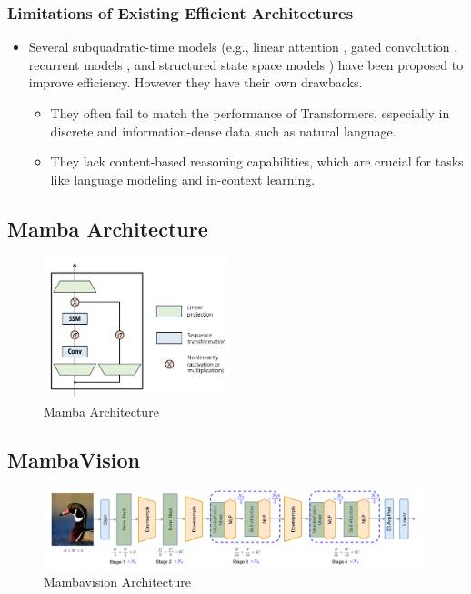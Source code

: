 \documentclass[12pt, conference, compsoc, onecolumn]{IEEEtran}
\begin{document}
	\subsubsection*{Limitations of Existing Efficient Architectures}
	\begin{itemize}
		\item Several subquadratic-time models (e.g., linear attention \cite{katharopoulos2020transformersrnnsfastautoregressive}, gated convolution \cite{rao2022hornetefficienthighorderspatial}, recurrent models \cite{bulatov2022recurrentmemorytransformer}, and structured state space models \cite{gu2022efficientlymodelinglongsequences}) have been proposed to improve efficiency. However they have their own drawbacks. 
		\begin{itemize}
			\item They often fail to match the performance of Transformers, especially in discrete and information-dense data such as natural language.
			\item They lack content-based reasoning capabilities, which are crucial for tasks like language modeling and in-context learning.
			
		\end{itemize}
		
	\end{itemize}
	
	\subsection{Mamba Architecture}
	\begin{figure}[H]
		\centering
		\includegraphics[width=0.48\textwidth]{figures/mamba_arch.png}
		\caption{Mamba Architecture\cite{gu2024mamba}}
		\label{fig:mamba_arch}
	\end{figure}
	
	
	
	\subsection{MambaVision}
	\begin{figure}[H]
		\centering
		\includegraphics[width=0.99\textwidth]{figures/mambavision_arch.png}
		\caption{Mambavision Architecture\cite{hatamizadeh2024mambavision}}
		\label{fig:mambavision_arch}
	\end{figure}
		
\end{document}
